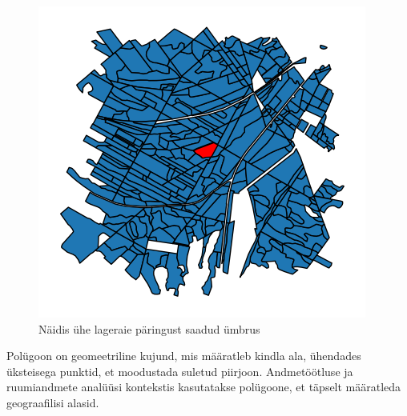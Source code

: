 \begin{figure}[hb]
    \centering
    \includegraphics[width=.5\textwidth]{figures/andmestik/er_id_is10124223.png}
    \caption{Näidis ühe lageraie päringust saadud ümbrus}
    \label{fig:umbrusexample}
\end{figure}

Polügoon on geomeetriline kujund, mis määratleb kindla ala, ühendades üksteisega
punktid, et moodustada suletud piirjoon. Andmetöötluse ja ruumiandmete analüüsi
kontekstis kasutatakse polügoone, et täpselt määratleda geograafilisi alasid. \cite{WhatLocationPolygon}

